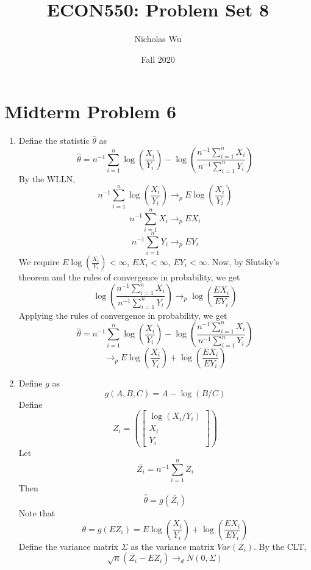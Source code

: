 \documentclass[10pt,letter]{article}
\begin{document}


\title{ECON550: Problem Set 8}

\author{Nicholas Wu}

\date{Fall 2020}

\maketitle
\section*{Midterm Problem 6}

\begin{enumerate}[label=(\alph*)]
\item Define the statistic $\hat{\theta}$ as
\[ \hat{\theta} = n^{-1}\sum_{i=1}^n \log\left(\frac{ X_i}{Y_i}\right) - \log\left(\frac{n^{-1}\sum_{i=1}^n X_i}{n^{-1}\sum_{i=1}^n Y_i}\right) \]
By the WLLN,
\[ n^{-1}\sum_{i=1}^n \log\left(\frac{ X_i}{Y_i}\right) \to_p E\log\left(\frac{ X_i}{Y_i}\right) \]
\[ n^{-1}\sum_{i=1}^n X_i \to_p EX_i \]
\[ n^{-1}\sum_{i=1}^n Y_i \to_p EY_i \]
We require $E\log\left(\frac{ X_i}{Y_i}\right) < \infty$, $EX_i < \infty$, $EY_i < \infty$. Now, by Slutsky's theorem and the rules of convergence in probability, we get
\[ \log\left(\frac{n^{-1}\sum_{i=1}^n X_i}{n^{-1}\sum_{i=1}^n Y_i}\right) \to_p \log \left( \frac{EX_i}{EY_i} \right)\]
Applying the rules of convergence in probability, we get
\[ \hat{\theta} = n^{-1}\sum_{i=1}^n \log\left(\frac{ X_i}{Y_i}\right) - \log\left(\frac{n^{-1}\sum_{i=1}^n X_i}{n^{-1}\sum_{i=1}^n Y_i}\right) \]
\[ \to_p E\log\left(\frac{ X_i}{Y_i}\right) + \log \left( \frac{EX_i}{EY_i} \right) \]
\item Define $g$ as
\[ g(A, B, C) = A - \log(B/C) \]
Define
\[ Z_i = \left(\begin{bmatrix} \log(X_i / Y_i) \\ X_i \\ Y_i \end{bmatrix} \right) \]
Let
\[ \bar{Z_i} = n^{-1} \sum_{i=1}^n Z_i \]
Then
\[ \hat{\theta} = g(\bar{Z_i}) \]
Note that
\[ \theta = g(EZ_i) =  E\log\left(\frac{ X_i}{Y_i}\right) + \log \left( \frac{EX_i}{EY_i} \right)\]
Define the variance matrix $\Sigma$ as the variance matrix $Var(Z_i)$.
By the CLT,
\[ \sqrt{n} (\bar{Z_i} - EZ_i ) \to_d N(0,\Sigma) \]

\end{enumerate}
\end{document}
